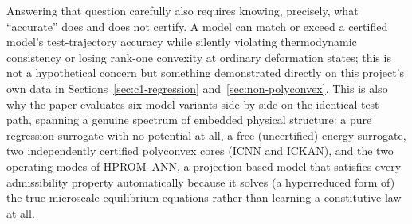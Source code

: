 \documentclass[10pt,a4paper]{article}
\begin{document}
Answering that question carefully also requires knowing, precisely, what
``accurate'' does and does not certify. A model can match or exceed a
certified model's test-trajectory accuracy while silently violating thermodynamic
consistency or losing rank-one convexity at ordinary deformation states;
this is not a hypothetical concern but something demonstrated directly on
this project's own data in Sections~\ref{sec:c1-regression}
and~\ref{sec:non-polyconvex}. This is also why the paper evaluates six
model variants side by side on the identical test path,
spanning a genuine spectrum of embedded physical structure: a pure
regression surrogate with no potential at all, a free (uncertified) energy
surrogate, two independently certified polyconvex cores (ICNN and ICKAN),
and the two operating modes of HPROM--ANN, a projection-based model that
satisfies every admissibility property automatically because it solves
(a hyperreduced form of) the true microscale equilibrium equations rather
than learning a constitutive law at all.
\end{document}
